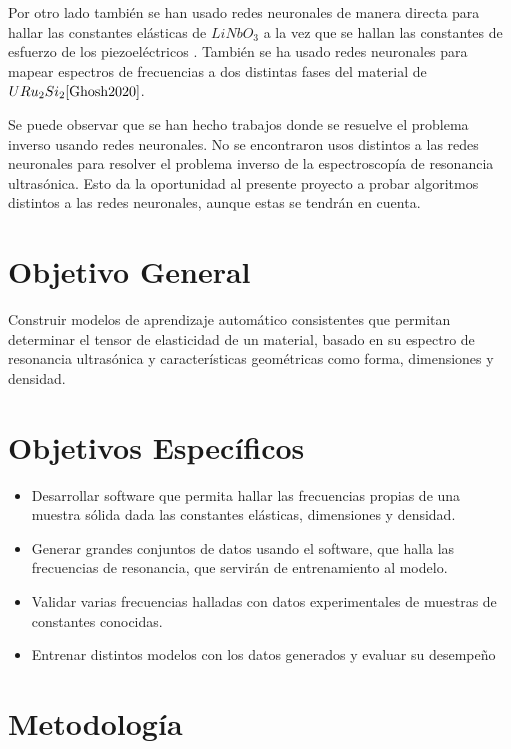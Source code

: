 \documentclass[12pt]{article}
\begin{document}
Por otro lado también se han usado redes neuronales de manera directa para hallar las constantes elásticas de $LiNbO_3$ a la vez que se hallan las constantes de esfuerzo de los piezoeléctricos \cite{Yang2022}. También se ha usado redes neuronales para mapear espectros de frecuencias a dos distintas fases del material de $URu_{2}Si_{2} \cite{Ghosh2020}$. 



Se puede observar que se han hecho trabajos donde se resuelve el problema inverso usando redes neuronales. No se encontraron usos distintos a las redes neuronales para resolver el problema inverso de la espectroscopía de resonancia ultrasónica. Esto da la oportunidad al presente proyecto a probar algoritmos distintos a las redes neuronales, aunque estas se tendrán en cuenta. 

\section{Objetivo General}

Construir modelos de aprendizaje automático consistentes que permitan determinar el tensor de elasticidad de un material, basado en su espectro de resonancia ultrasónica y características geométricas como forma, dimensiones y densidad.
\section{Objetivos Específicos}


\begin{itemize}
	\item Desarrollar software que permita hallar las frecuencias propias de una muestra sólida dada las constantes elásticas, dimensiones y densidad.
	\item Generar grandes conjuntos de datos usando el software, que halla las frecuencias de resonancia, que servirán de entrenamiento al modelo. 
	\item Validar varias frecuencias halladas con datos experimentales de muestras de constantes conocidas.
	\item Entrenar distintos modelos con los datos generados y evaluar su desempeño
\end{itemize}

\section{Metodología}
\end{document}
